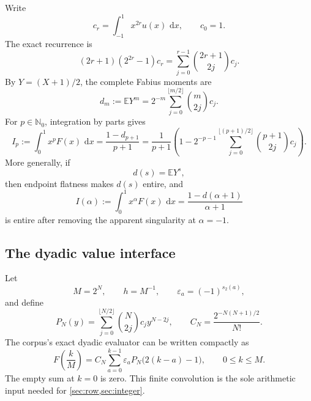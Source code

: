 \documentclass[11pt,oneside]{article}
\numberwithin{equation}{section}
\theoremstyle{definition}
\theoremstyle{remark}
\newcommand{\N}{\mathbb N}
\newcommand{\E}{\mathbb E}
\newcommand{\dd}{\,\mathrm d}
\newcommand{\wt}{s_2}
\begin{document}
Write
\begin{equation}
 c_r=\int_{-1}^{1}x^{2r}u(x)\,\dd x,
 \qquad c_0=1.
 \label{eq:cr}
\end{equation}
The exact recurrence is
\begin{equation}
 (2r+1)(2^{2r}-1)c_r
 =\sum_{j=0}^{r-1}\binom{2r+1}{2j}c_j.
 \label{eq:c-recurrence}
\end{equation}
By \(Y=(X+1)/2\), the complete Fabius moments are
\begin{equation}
 d_m:=\E Y^m
 =2^{-m}\sum_{j=0}^{\lfloor m/2\rfloor}\binom m{2j}c_j.
 \label{eq:dm-from-c}
\end{equation}
For \(p\in\N_0\), integration by parts gives
\begin{equation}
 I_p:=\int_0^1x^pF(x)\,\dd x
 =\frac{1-d_{p+1}}{p+1}
 =\frac1{p+1}\left(
 1-2^{-p-1}\sum_{j=0}^{\lfloor(p+1)/2\rfloor}
 \binom{p+1}{2j}c_j\right).
 \label{eq:Ip}
\end{equation}
More generally, if
\begin{equation}
 d(s)=\E Y^s,
 \label{eq:entire-moment}
\end{equation}
then endpoint flatness makes \(d(s)\) entire, and
\begin{equation}
 I(\alpha):=\int_0^1x^\alpha F(x)\,\dd x
 =\frac{1-d(\alpha+1)}{\alpha+1}
 \label{eq:Ialpha}
\end{equation}
is entire after removing the apparent singularity at \(\alpha=-1\).

\subsection{The dyadic value interface}

Let
\begin{equation}
 M=2^N,
 \qquad h=M^{-1},
 \qquad \varepsilon_a=(-1)^{\wt(a)},
 \label{eq:M-h-eps}
\end{equation}
and define
\begin{equation}
 P_N(y)=\sum_{j=0}^{\lfloor N/2\rfloor}
 \binom N{2j}c_jy^{N-2j},
 \qquad
 C_N=\frac{2^{-N(N+1)/2}}{N!}.
 \label{eq:PN-CN}
\end{equation}
The corpus's exact dyadic evaluator can be written compactly as
\begin{equation}
 \boxed{\displaystyle
 F\!\left(\frac{k}{M}\right)
 =C_N\sum_{a=0}^{k-1}\varepsilon_a
 P_N\bigl(2(k-a)-1\bigr),
 \qquad 0\le k\le M.}
 \label{eq:dyadic-convolution}
\end{equation}
The empty sum at \(k=0\) is zero.  This finite convolution is the sole arithmetic
input needed for \cref{sec:row,sec:integer}.
\end{document}
